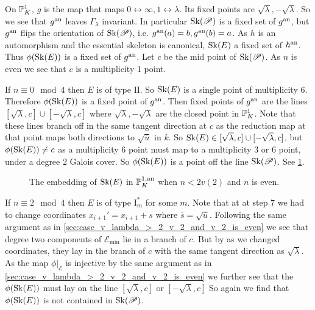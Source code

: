 On $\mathbb{P}^{1}_K$, $g$ is the map that maps $0 \leftrightarrow \infty, 1 \leftrightarrow \lambda$. 
Its fixed points are $\sqrt{\lambda}, -\sqrt{\lambda}$. 
So we see that $g{}^{\text{an}}$ leaves $\Gamma_\lambda$ invariant. In particular $\operatorname{Sk}(\mathscr P)$ is a fixed set of $g{}^{\text{an}}$, but $g{}^{\text{an}}$ flips the orientation of $\operatorname{Sk}(\mathscr P)$, i.e. $g{}^{\text{an}}(a) = b, g{}^{\text{an}}(b) = a$. 
As $h$ is an automorphism and the essential skeleton is canonical, $\operatorname{Sk}(E)$ a fixed set of $h{}^{\text{an}}$. 
Thus $\phi(\sk(E))$ is a fixed set of $g{}^{\text{an}}$.
Let $c$ be the mid point of $\operatorname{Sk}(\mathscr P)$. 
As $n$ is even we see that $c$ is a multiplicity 1 point. 

\medskip

If  $n \equiv 0 \mod 4$ then $E$ is of type $\mathrm{II}$.  
So $\operatorname{Sk}(E)$ is a single point of multiplicity 6. 
Therefore  $\phi(\sk(E))$ is a fixed point of $g{}^{\text{an}}$. 
Then fixed points of $g{}^{\text{an}}$ are the lines  $[\sqrt{\lambda}, c] \cup [-\sqrt{\lambda} , c]$ where $\sqrt{\lambda}, -\sqrt{\lambda}$ are the closed point in $\mathbb{P}^{1}_K$. 
Note that these lines branch off in the same tangent direction at $c$ as the reduction map at that point maps both directions to  $\sqrt{\overline{u}} $ in $k$. 
So $\operatorname{Sk}(E) \in [\sqrt{\lambda}, c] \cup [-\sqrt{\lambda}, c] $, but $\phi(\sk(E)) \ne c$ as a multiplicity 6 point must map to a multiplicity 3 or 6 point, under a degree 2 Galois cover. 
So $\phi(\sk(E))$ is a point off the line $\operatorname{Sk}(\mathscr P)$. 
See \cref{fig:image_skeleton_wild_n_le_2v2_n_even}. 

\begin{figure}[h]
    \centering
    \caption{The embedding of $\operatorname{Sk}(E)$ in $\mathbb{P}^{1, \text{an}}_K$ when $n < 2v(2)$ and  $n$ is even.}
    \label{fig:image_skeleton_wild_n_le_2v2_n_even}
\end{figure}
\medskip 
If $n \equiv 2 \mod 4$ then $E$ is of type $\mathrm I_{m}^*$ for some $m$. 
Note that at at step 7 we had to change coordinates $x_{i+1}' = x_{i + 1}  + s$ where $\overline{s} = \sqrt{\overline{u}} $. 
Following the same argument as in \cref{sec:case_v_lambda_>_2_v_2_and_v_2_is_even} we see that degree two components of $\mathscr E_\text{min} $ lie in a branch of $c$. 
But by as we changed coordinates, they lay in the branch of $c$ with the same tangent direction as $\sqrt{\lambda} $. 
As the map $\phi|_{\mathscr E}$ is injective by the same argument as in \cref{sec:case_v_lambda_>_2_v_2_and_v_2_is_even} we further see that the $\phi(\sk(E))$ must lay on the line $[\sqrt{\lambda}, c] $ or $[-\sqrt{\lambda} , c]$
So again we find that $\phi(\sk (E))$ is not contained in $\operatorname{Sk}(\mathscr P)$. 


